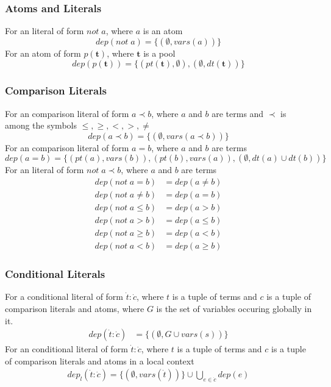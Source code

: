 \documentclass{article}
\newcommand{\pool}[1]{\boldsymbol{#1}}
\newcommand{\tuple}[1]{\dot{#1}}
\newcommand{\set}[1]{\{#1\}}
\newcommand{\dep}[2]{\{(#1), (#2)\}}
\begin{document}
	\subsubsection{Atoms and Literals}
	For an literal of form $not \; a$, where $a$ is an atom
	\begin{equation*}
		dep(not \; a) = \set{(\emptyset, vars(a))}
	\end{equation*}
	For an atom of form $p(\pool{t})$, where $\pool{t}$ is a pool
	\begin{equation*}
		dep(p(\pool{t})) = \dep{pt(\pool{t}), \emptyset}{\emptyset, dt(\pool{t})}
	\end{equation*}

	\subsubsection{Comparison Literals}
	For an comparison literal of form $a \prec b$, where $a$ and $b$ are terms and $\prec$ is among the symbols $\leq,\ge,<,>,\neq$
	\begin{equation*}
		dep(a \prec b) = \set{(\emptyset, vars(a \prec b))}
	\end{equation*}
	For an comparison literal of form $a = b$, where $a$ and $b$ are terms
	\begin{equation*}
		dep(a = b) = \set{(pt(a), vars(b)), (pt(b), vars(a)), (\emptyset, dt(a) \cup dt(b))}
	\end{equation*}
	For an literal of form $not \; a \prec b$, where $a$ and $b$ are terms
	\begin{align*}
		dep(not \; a = b) &= dep(a \neq b) \\
		dep(not \; a \neq b) &= dep(a = b) \\
		dep(not \; a \leq b) &= dep(a > b) \\
		dep(not \; a > b) &= dep(a \leq b) \\
		dep(not \; a \ge b) &= dep(a < b) \\
		dep(not \; a < b) &= dep(a \ge b)
	\end{align*}

	\subsubsection{Conditional Literals}
	For a conditional literal of form $\tuple{t} : \tuple{c}$, where $t$ is a tuple of terms and $c$ is a tuple of comparison literals and atoms, where $G$ is the set of variables occuring globally in it.
	\begin{align*}
		dep(\tuple{t} : \tuple{c}) &= \set{(\emptyset, G \cup vars(s))}
	\end{align*}
	For an conditional literal of form $\tuple{t} : \tuple{c}$, where $t$ is a tuple of terms and $c$ is a tuple of comparison literals and atoms in a local context
	\begin{align*}
		dep_l(\tuple{t} : \tuple{c}) = \set{(\emptyset, vars(\tuple{t}))} \cup \bigcup_{e \in \tuple{c}} dep(e)
	\end{align*}
\end{document}
